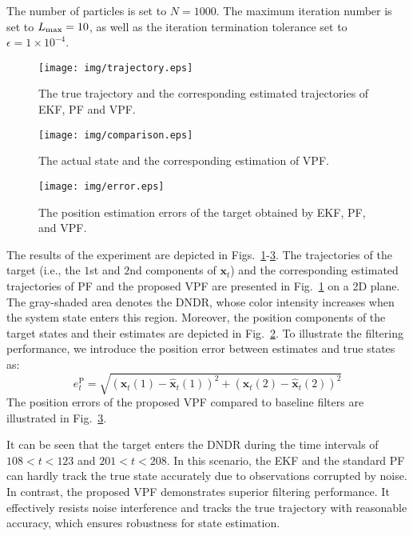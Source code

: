 \documentclass[10pt,twocolumn,twoside]{IEEEtran}
\newcommand{\x}{{ \bm{x} }}
\begin{document}
The number of particles is set to $N = 1000$. The maximum iteration number is set to $L_{\rm max}=10$, as well as the iteration termination tolerance set to $\epsilon=1\times10^{-4}$.

\begin{figure}[htbp]
    \centering
    \texttt{[image: img/trajectory.eps]}
    \caption{The true trajectory and the corresponding estimated trajectories of EKF, PF and VPF.}
    \label{fig:trajectory}
\end{figure}

\begin{figure}[htbp]
    \centering
    \texttt{[image: img/comparison.eps]}
    \caption{The actual state and the corresponding estimation of VPF.}
    \label{fig:comparison}
\end{figure}

\begin{figure}[htbp]
    \centering
    \texttt{[image: img/error.eps]}
    \caption{The position estimation errors of the target obtained by EKF, PF, and VPF.}
    \label{fig:error}
\end{figure}

The results of the experiment are depicted in Figs.~\ref{fig:trajectory}-\ref{fig:error}. The trajectories of the target (i.e., the $1$st and $2$nd components of $\x_t$) and the corresponding estimated trajectories of PF and the proposed VPF are presented in Fig.~\ref{fig:trajectory} on a 2D plane. The gray-shaded area denotes the DNDR, whose color intensity increases when the system state enters this region. Moreover, the position components of the target states and their estimates are depicted in Fig.~\ref{fig:comparison}. To illustrate the filtering performance, we introduce the position error between estimates and true states as:
$$
e_t^\mathrm{P} = \sqrt{(\x_t(1)-\hat{\x}_t(1))^2+(\x_t(2)-\hat{\x}_t(2))^2}
$$
The position errors of the proposed VPF compared to baseline filters are illustrated in Fig.~\ref{fig:error}.

It can be seen that the target enters the DNDR during the time intervals of $108<t<123$ and $201<t<208$. In this scenario, the EKF and the standard PF can hardly track the true state accurately due to observations corrupted by noise. In contrast, the proposed VPF demonstrates superior filtering performance. It effectively resists noise interference and tracks the true trajectory with reasonable accuracy, which ensures robustness for state estimation.
\end{document}
